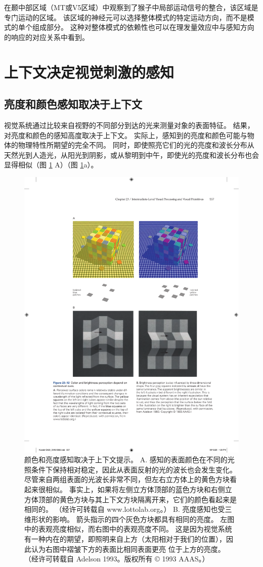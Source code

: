 在颞中部区域（MT或V5区域）中观察到了猴子中局部运动信号的整合，该区域是专门运动的区域。
该区域的神经元可以选择整体模式的特定运动方向，而不是模式的单个组成部分。
这种对整体模式的依赖性也可以在理发量效应中与感知方向的响应的对应关系中看到。



\section{上下文决定视觉刺激的感知}

\subsection{亮度和颜色感知取决于上下文}

视觉系统通过比较来自视野的不同部分到达的光来测量对象的表面特征。
结果，对亮度和颜色的感知高度取决于上下文。 
实际上，感知到的亮度和颜色可能与物体的物理特性所期望的完全不同。
同时，即使照亮它们的光的亮度和波长分布从天然光到人造光，从阳光到阴影，或从黎明到中午，即使光的亮度和波长分布也会显得相似（图 \ref{fig:23_12} A）（图 \ref{fig:23_12}a）。

\begin{figure}[htbp]
	\centering
	\includegraphics[width=0.7\linewidth]{chap23/fig_23_12}
	\caption{颜色和亮度感知取决于上下文提示。 A. 感知的表面颜色在不同的光照条件下保持相对稳定，因此从表面反射的光的波长也会发生变化。 尽管来自两组表面的光波长非常不同，但左右立方体上的黄色方块看起来很相似。 事实上，如果将左侧立方体顶部的蓝色方块和右侧立方体顶部的黄色方块与其上下文方块隔离开来，它们的颜色看起来是相同的。 （经许可转载自 www.lottolab.org。） B. 亮度感知也受三维形状的影响。 箭头指示的四个灰色方块都具有相同的亮度。 左图中的表观亮度相似，而右图中的表观亮度不同。 这是因为视觉系统有一种内在的期望，即照明来自上方（太阳相对于我们的位置），因此认为右图中褶皱下方的表面比相同表面更亮 位于上方的亮度。 （经许可转载自 Adelson 1993。版权所有 © 1993 AAAS。）}
	\label{fig:23_12}
\end{figure}


